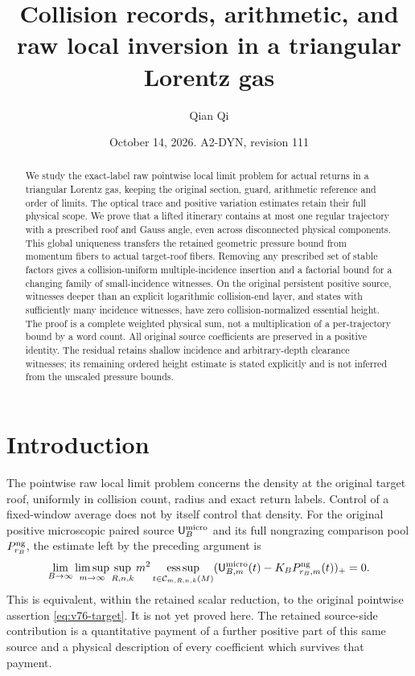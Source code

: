 \documentclass[11pt,reqno]{amsart}
\title[Collision records and raw local inversion]{Collision records, arithmetic, and raw local inversion in a triangular Lorentz gas}
\author{Qian Qi}
\date{October 14, 2026. A2-DYN, revision 111}
\numberwithin{equation}{section}
\theoremstyle{definition}\newtheorem{definition}[theorem]{Definition}
\theoremstyle{remark}\newtheorem{remark}[theorem]{Remark}
\newcommand{\esssup}{\operatorname*{ess\,sup}}
\begin{document}
\raggedbottom
\begin{abstract}
We study the exact-label raw pointwise local limit problem for actual
returns in a triangular Lorentz gas, keeping the original section,
guard, arithmetic reference and order of limits. The optical trace
and positive variation estimates retain their full physical scope.
We prove that a lifted itinerary contains at most one regular
trajectory with a prescribed roof and Gauss angle, even across
disconnected physical components. This global uniqueness transfers
the retained geometric pressure bound from momentum fibers to actual
target-roof fibers. Removing any prescribed set of stable factors
gives a collision-uniform multiple-incidence insertion and a factorial
bound for a changing family of small-incidence witnesses. On the
original persistent positive source, witnesses deeper than an explicit
logarithmic collision-end layer, and states with sufficiently many
incidence witnesses, have zero collision-normalized essential height.
The proof is a complete weighted physical sum, not a multiplication
of a per-trajectory bound by a word count. All original source
coefficients are preserved in a positive identity. The residual
retains shallow incidence and arbitrary-depth clearance witnesses;
its remaining ordered height estimate is stated explicitly and is
not inferred from the unscaled pressure bounds.
\end{abstract}
\maketitle

\section*{Introduction}
The pointwise raw local limit problem concerns the density at the
original target roof, uniformly in collision count, radius and exact
return labels. Control of a fixed-window average does not by itself
control that density. For the original positive microscopic paired
source $\mathsf U_B^{\rm micro}$ and its full nongrazing comparison
pool $P_{r_B}^{\rm ng}$, the estimate left by the preceding argument is
\begin{equation}\label{eq:v110-intro-original}
 \lim_{B\to\infty}\limsup_{m\to\infty}\sup_{R,n,k}m^2
 \esssup_{t\in\mathcal C_{m,R,n,k}(M)}
 (\mathsf U_{B,m}^{\rm micro}(t)
                      -K_BP_{r_B,m}^{\rm ng}(t))_+=0.
\end{equation}
This is equivalent, within the retained scalar reduction, to the
original pointwise assertion \eqref{eq:v76-target}. It is not yet
proved here. The retained source-side contribution is a quantitative payment of
a further positive part of this same source and a physical description
of every coefficient which survives that payment.
\end{document}
